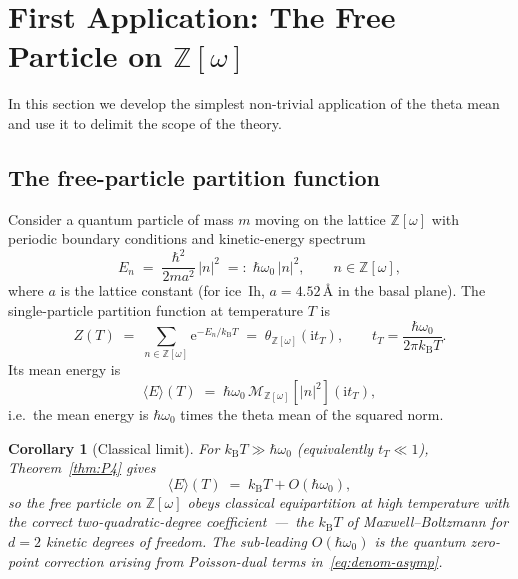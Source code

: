 \documentclass[11pt,letterpaper]{article}
\theoremstyle{plain}
\newtheorem{corollary}[theorem]{Corollary}
\theoremstyle{definition}
\newcommand{\Eisenstein}{\mathbb{Z}[\omega]}
\newcommand{\tmeaneis}[1]{\mathcal{M}_{\Eisenstein}[#1]}
\newcommand{\e}{\mathrm{e}}
\begin{document}
\section{First Application: The Free Particle on $\Eisenstein$}
\label{sec:free-particle}

In this section we develop the simplest non-trivial application
of the theta mean and use it to delimit the scope of the theory.

\subsection{The free-particle partition function}

Consider a quantum particle of mass $m$ moving on the lattice
$\Eisenstein$ with periodic boundary conditions and kinetic-energy
spectrum
\begin{equation}\label{eq:fp-spectrum}
  E_n \;=\; \frac{\hbar^2}{2m a^2}\,|n|^2
         \;=:\; \hbar\omega_0\,|n|^2,
  \qquad n \in \Eisenstein,
\end{equation}
where $a$ is the lattice constant (for ice~Ih, $a=4.52\,\text{\AA}$
in the basal plane).  The single-particle partition function at
temperature $T$ is
\begin{equation}\label{eq:fp-Z}
  Z(T) \;=\; \sum_{n\in\Eisenstein} \e^{-E_n/k_{\mathrm{B}} T}
        \;=\; \theta_{\Eisenstein}(\mathrm{i} t_T),
  \qquad t_T = \frac{\hbar\omega_0}{2\pi k_{\mathrm{B}} T}.
\end{equation}
Its mean energy is
\begin{equation}\label{eq:fp-E}
  \langle E\rangle(T) \;=\; \hbar\omega_0\,\tmeaneis{|n|^2}(\mathrm{i} t_T),
\end{equation}
i.e.\ the mean energy is $\hbar\omega_0$ times the theta mean of the
squared norm.

\begin{corollary}[Classical limit]\label{cor:classical}
For $k_{\mathrm{B}} T \gg \hbar\omega_0$ (equivalently $t_T\ll 1$),
Theorem~\ref{thm:P4} gives
\begin{equation}\label{eq:classical-limit}
  \langle E\rangle(T) \;=\; k_{\mathrm{B}} T + O(\hbar\omega_0),
\end{equation}
so the free particle on $\Eisenstein$ obeys classical equipartition
at high temperature \emph{with the correct two-quadratic-degree
coefficient}~---~the $k_{\mathrm{B}} T$ of Maxwell--Boltzmann for
$d=2$ kinetic degrees of freedom.  The sub-leading $O(\hbar\omega_0)$
is the quantum zero-point correction arising from Poisson-dual terms
in~\eqref{eq:denom-asymp}.
\end{corollary}
\end{document}
